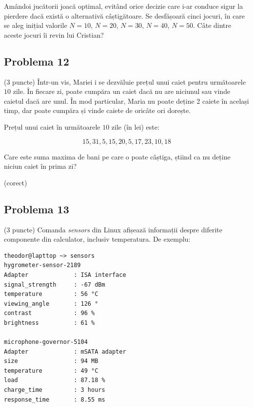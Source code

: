 \documentclass{exam}
\begin{document}
Amândoi jucătorii joacă optimal, evitând orice decizie care i-ar conduce sigur la pierdere dacă există o alternativă câștigătoare. Se desfășoară cinci jocuri, în care se aleg inițial valorile $N = 10$, $N = 20$, $N = 30$, $N = 40$, $N = 50$. Câte dintre aceste jocuri îi revin lui Cristian?

\begin{oneparchoices}
\end{oneparchoices}

\subsection*{Problema 12}

(3 puncte) Într-un vis, Mariei i se dezvăluie prețul unui caiet pentru următoarele $10$ zile. În fiecare zi, poate cumpăra un caiet dacă nu are niciunul sau vinde caietul dacă are unul. În mod particular, Maria nu poate deține 2 caiete în același timp, dar poate cumpăra și vinde caiete de oricâte ori dorește.

Prețul unui caiet în următoarele $10$ zile (în lei) este:

$$
15, 31, 5, 15, 20, 5, 17, 23, 10, 18
$$

Care este suma maxima de bani pe care o poate câștiga, știind ca nu deține niciun caiet în prima zi?



\begin{oneparchoices}
  (corect)
\end{oneparchoices}

\subsection*{Problema 13}

(3 puncte) Comanda \textit{sensors} din Linux afișează informații despre diferite componente din calculator, inclusiv temperatura. De exemplu:

\begin{verbatim}
theodor@lapttop ~> sensors
hygrometer-sensor-2189
Adapter             : ISA interface
signal_strength     : -67 dBm
temperature         : 56 °C
viewing_angle       : 126 °
contrast            : 96 %
brightness          : 61 %

microphone-governor-5104
Adapter             : mSATA adapter
size                : 94 MB
temperature         : 49 °C
load                : 87.18 %
charge_time         : 3 hours
response_time       : 8.55 ms
\end{verbatim}
\end{document}
